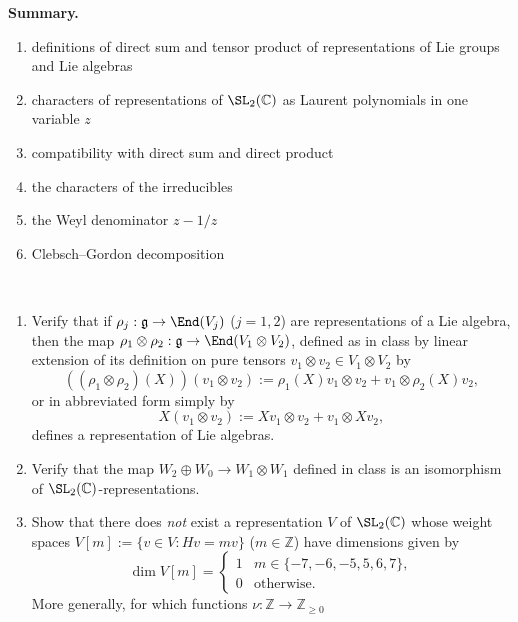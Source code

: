 \documentclass[reqno]{amsart} 
\begin{document}
\textbf{Summary.}
\begin{enumerate}
\item definitions of direct sum and tensor product of representations of Lie groups and Lie algebras
\item characters of representations of \(\SL_2(\mathbb{C})\) as Laurent polynomials in one variable \(z\)
\item compatibility with direct sum and direct product
\item the characters of the irreducibles
\item the Weyl denominator \(z - 1/z\)
\item Clebsch--Gordon decomposition
\end{enumerate}
\begin{homework}~\label{hw:characters-sl2}
  \begin{enumerate}
  \item Verify that if $\rho_j : \mathfrak{g} \rightarrow \End(V_j)$ ($j=1,2$) are representations of a Lie algebra, then the map $\rho_1 \otimes \rho_2 : \mathfrak{g} \rightarrow \End(V_1 \otimes V_2)$, defined as in class by linear extension of its definition on pure tensors $v_1 \otimes v_2 \in V_1 \otimes V_2$ by
    \begin{equation*}
      ((\rho_1 \otimes \rho_2)(X))(v_1 \otimes v_2) := \rho_1(X) v_1 \otimes v_2 + v_1 \otimes \rho_2(X) v_2,
    \end{equation*}
    or in abbreviated form simply by
    \begin{equation*}
      X(v_1 \otimes v_2) := X v_1 \otimes v_2
    + v_1 \otimes X v_2,
    \end{equation*}
    defines a representation of Lie algebras.
  \item
    Verify that the map
    $W_2 \oplus W_0 \rightarrow W_1 \otimes W_1$
    defined in class
    is an
    isomorphism of $\SL_2(\mathbb{C})$-representations.
  \item
    Show that there does \emph{not} exist
    a representation $V$ of $\SL_2(\mathbb{C})$
    whose weight spaces $V[m] := \{ v \in V : H v = m v \}$ ($m \in \mathbb{Z}$) have dimensions
    given by
    \begin{equation*}
      \dim V[m] = 
\begin{cases}
        1 & m \in \{-7,-6,-5,5,6,7\}, \\
        0 & \text{otherwise.}
      \end{cases}
    \end{equation*}
    More generally, for which functions $\nu : \mathbb{Z} \rightarrow \mathbb{Z}_{\geq 0}$

\end{enumerate}
\end{homework}
\end{document}
